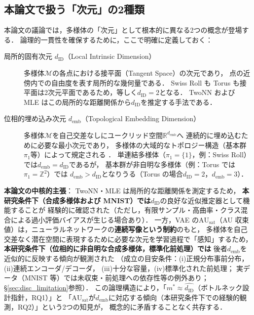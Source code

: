 \documentclass[12pt,a4paper]{jsarticle}
\newcommand{\dID}{d_{\mathrm{ID}}}
\newcommand{\dzopt}{m^*}                    %
\newcommand{\R}{\mathbb{R}}
\newcommand{\AUsat}{\mathrm{AU}_{\mathrm{sat}}}
\newcommand{\demb}{d_{\mathrm{emb}}}
\begin{document}
\subsection{本論文で扱う「次元」の2種類}\label{sec:intro_dim}

本論文の議論では，多様体の「次元」として根本的に異なる2つの概念が登場する．
論理的一貫性を確保するために，ここで明確に定義しておく：

\begin{description}
  \item[局所的固有次元 $\dID$（Local Intrinsic Dimension）]
        多様体$\mathcal{M}$の各点における接平面（Tangent Space）の次元であり，
        点の近傍内での自由度を表す局所的な幾何量である．
        Swiss Roll も Torus も接平面は2次元平面であるため，等しく$\dID = 2$となる．
        TwoNN および MLE はこの局所的な距離関係から$\dID$を推定する手法である．

  \item[位相的埋め込み次元 $\demb$（Topological Embedding Dimension）]
        多様体$\mathcal{M}$を自己交差なしにユークリッド空間$\R^{\demb}$へ
        連続的に埋め込むために必要な最小次元であり，
        多様体の大域的なトポロジー構造（基本群$\pi_1$等）によって規定される
        \cite{hatcher2002algebraic,guillemin1974differential}．
        単連結多様体（$\pi_1 = \{1\}$，例：Swiss Roll）では$\demb = \dID$であるが，
        基本群が非自明な多様体（例：Torus では$\pi_1 = \mathbb{Z}^2$）では
        $\demb > \dID$となりうる（Torus の場合$\dID = 2$，$\demb = 3$）．
\end{description}

\textbf{本論文の中核的主張}：
TwoNN・MLE は局所的な距離関係を測定するため，
\textbf{本研究条件下（合成多様体および MNIST）では}$\dID$の良好な近似推定器として機能することが
経験的に確認された（ただし，有限サンプル・高曲率・クラス混合による過小評価バイアスが生じる場合あり）．
一方，VAE の$\AUsat$（AU 収束値）は，ニューラルネットワークの\textbf{連続写像という制約}のもと，
多様体を自己交差なく潜在空間に表現するために必要な次元を学習過程で「感知」するため，
\textbf{本研究条件下（位相的に非自明な合成多様体，標準化前処理）では}
後者$\demb$を近似的に反映する傾向が観測された
\cite{hatcher2002algebraic,carlsson2009topology}
（成立の目安条件：(i)正規分布事前分布，(ii)連続エンコーダ/デコーダ，
(iii)十分な容量，(iv)標準化された前処理；
実データ（MNIST 等）では未収束・前処理への依存性等の例外あり；§\ref{sec:disc_limitation}参照）．
この論理構造により，「$\dzopt \approx \hat{\dID}$（ボトルネック設計指針，RQ1）」と
「$\AUsat$が$\demb$に対応する傾向（本研究条件下での経験的観測，RQ2）」という2つの知見が，
概念的に矛盾することなく共存する．
\end{document}
